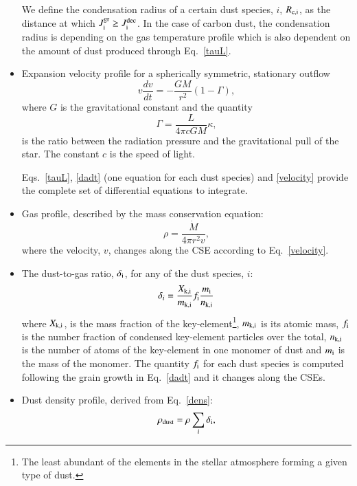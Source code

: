 \documentclass[useAMS,usenatbib]{mn2e/mn2e}
\begin{document}
\begin{itemize}
We define the condensation radius of a certain dust species, $i$, $R_{\rm c, i}$, as the distance at which  $J^{\rm gr}_{\rm i} \ge J^{\rm dec}_{\rm i}$.
In the case of carbon dust, the condensation radius is depending on the gas temperature profile which is also dependent on the amount of dust produced through Eq.~\ref{tauL}.

\item Expansion velocity profile for a spherically symmetric, stationary outflow
\begin{equation}\label{velocity}
v \frac{dv}{dt}=-\frac{G M}{r^2}(1-\Gamma),
\end{equation}
%
where $G$ is the gravitational constant and the quantity
\begin{equation}\label{gamma}
\Gamma=\frac{L}{4\pi c G M} \kappa,
\end{equation}
is the ratio between the radiation pressure and the gravitational pull of the star. The constant $c$ is the speed of light.

Eqs.~\ref{tauL}, \ref{dadt} (one equation for each dust species) and \ref{velocity} provide the complete set of differential equations to integrate.

\item Gas profile, described by the mass conservation equation:
\begin{equation}\label{dens}
\rho=\frac{\dot{M}}{4\pi r^2 v},
\end{equation}
%
where the velocity, $v$, changes along the CSE according to Eq.~\ref{velocity}. 

\item The dust-to-gas ratio, $\delta_{\rm i}$, for any of the dust species, $i$:
\begin{equation}\label{delta_i}
\delta_i=\frac{X_{\rm k, i}}{m_{\rm k,i}}f_{\rm i}\frac{m_{\rm i}}{n_{\rm k,i}}
\end{equation}
%
where $X_{\rm k, i}$, is the mass fraction of the key-element\footnote{The least abundant of the elements in the stellar atmosphere forming a given type of dust.}, $m_{\rm k,i}$ is its atomic mass, $f_{\rm i}$ is the number fraction of condensed key-element particles over the total, $n_{\rm k,i}$ is the number of atoms of the key-element in one monomer of dust and $m_{\rm i}$ is the mass of the monomer.
The quantity $f_{\rm i}$ for each dust species is computed following the grain growth in Eq.~\ref{dadt} and it changes along the CSEs.

\item Dust density profile, derived from Eq.~\ref{dens}:
\begin{equation}\label{d_dens}
\rho_{\rm dust}=\rho\sum_i\delta_{\rm i},
\end{equation}


\end{itemize}
\end{document}
